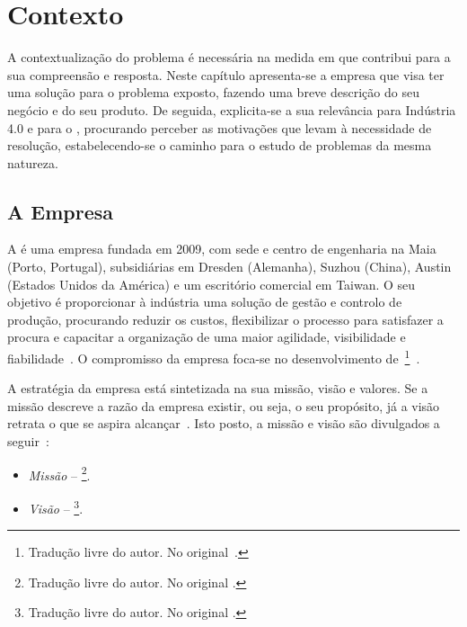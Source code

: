 \chapter{Contexto}
\label{chap:Chapter2}
A contextualização do problema é necessária na medida em que contribui para a sua compreensão e resposta. Neste capítulo apresenta-se a empresa que visa ter uma solução para o problema exposto, fazendo uma breve descrição do seu negócio e do seu produto. De seguida, explicita-se a sua relevância para Indústria 4.0 e para o {\productname}, procurando perceber as motivações que levam à necessidade de resolução, estabelecendo-se o caminho para o estudo de problemas da mesma natureza.

\section{A Empresa}
\label{sec:chap02_company}
A {\companyname} é uma empresa fundada em 2009, com sede e centro de engenharia na Maia (Porto, Portugal), subsidiárias em Dresden (Alemanha), Suzhou (China), Austin (Estados Unidos da América) e um escritório comercial em Taiwan. O seu objetivo é proporcionar à indústria uma solução de gestão e controlo de produção, procurando reduzir os custos, flexibilizar o processo para satisfazer a procura e capacitar a organização de uma maior agilidade, visibilidade e fiabilidade~\parencite{cmf_overview}. O compromisso da empresa foca-se no desenvolvimento de~\footnote{Tradução livre do autor. No original~.}~\parencite{cmf_overview}.

A estratégia da empresa está sintetizada na sua missão, visão e valores. Se a missão descreve a razão da empresa existir, ou seja, o seu propósito, já a visão retrata o que se aspira alcançar~\parencite[pp.~65-66]{mission_vision_values_what_do_they_say}. Isto posto, a missão e visão são divulgados a seguir~\parencite{cmf_strategy}: 

\begin{itemize}
    \item 
    {
        \textit{Missão} -- \footnote{Tradução livre do autor. No original .}.
    }
    \item 
    {
        \textit{Visão} -- \footnote{Tradução livre do autor. No original .}.
    }
\end{itemize}

